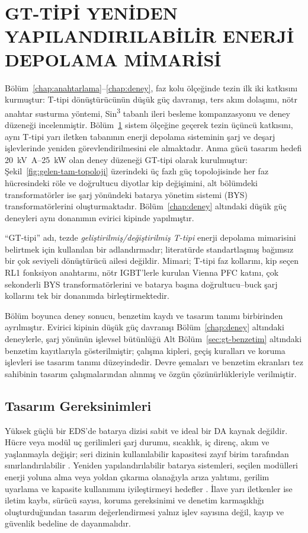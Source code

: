 \chapter{GT-TİPİ YENİDEN YAPILANDIRILABİLİR ENERJİ DEPOLAMA MİMARİSİ}
\label{chap:gttipi}

Bölüm~\ref{chap:anahtarlama}--\ref{chap:deney}, faz kolu ölçeğinde tezin ilk iki katkısını kurmuştur: T-tipi dönüştürücünün düşük güç davranışı, ters akım dolaşımı, nötr anahtar susturma yöntemi, Sin\textsuperscript{3} tabanlı ileri besleme kompanzasyonu ve deney düzeneği incelenmiştir. Bölüm~\ref{chap:gttipi} sistem ölçeğine geçerek tezin üçüncü katkısını, aynı T-tipi yarı iletken tabanının enerji depolama sisteminin şarj ve deşarj işlevlerinde yeniden görevlendirilmesini ele almaktadır. Anma gücü tasarım hedefi \SI{20}{\kilo\volt\ampere}--\SI{25}{\kilo\watt} olan deney düzeneği GT-tipi olarak kurulmuştur: Şekil~\ref{fig:gelen-tam-topoloji} üzerindeki üç fazlı güç topolojisinde her faz hücresindeki röle ve doğrultucu diyotlar kip değişimini, alt bölümdeki transformatörler ise şarj yönündeki batarya yönetim sistemi (BYS) transformatörlerini oluşturmaktadır. Bölüm~\ref{chap:deney} altındaki düşük güç deneyleri aynı donanımın evirici kipinde yapılmıştır.

``GT-tipi'' adı, tezde \emph{geliştirilmiş/değiştirilmiş T-tipi} enerji depolama mimarisini belirtmek için kullanılan bir adlandırmadır; literatürde standartlaşmış bağımsız bir çok seviyeli dönüştürücü ailesi değildir. Mimari; T-tipi faz kollarını, kip seçen RL1 fonksiyon anahtarını, nötr IGBT'lerle kurulan Vienna PFC katını, çok sekonderli BYS transformatörlerini ve batarya başına doğrultucu--buck şarj kollarını tek bir donanımda birleştirmektedir.

Bölüm boyunca deney sonucu, benzetim kaydı ve tasarım tanımı birbirinden ayrılmıştır. Evirici kipinin düşük güç davranışı Bölüm~\ref{chap:deney} altındaki deneylerle, şarj yönünün işlevsel bütünlüğü Alt Bölüm~\ref{sec:gt-benzetim} altındaki benzetim kayıtlarıyla gösterilmiştir; çalışma kipleri, geçiş kuralları ve koruma işlevleri ise tasarım tanımı düzeyindedir. Devre şemaları ve benzetim ekranları tez sahibinin tasarım çalışmalarından alınmış ve özgün çözünürlükleriyle verilmiştir.

\section{Tasarım Gereksinimleri}
\label{sec:gt-gereksinimler}

Yüksek güçlü bir EDS'de batarya dizisi sabit ve ideal bir DA kaynak değildir. Hücre veya modül uç gerilimleri şarj durumu, sıcaklık, iç direnç, akım ve yaşlanmayla değişir; seri dizinin kullanılabilir kapasitesi zayıf birim tarafından sınırlandırılabilir \citep{Plett2015,Hannan2017,Farakhor2023}. Yeniden yapılandırılabilir batarya sistemleri, seçilen modülleri enerji yoluna alma veya yoldan çıkarma olanağıyla arıza yalıtımı, gerilim uyarlama ve kapasite kullanımını iyileştirmeyi hedefler \citep{Momayyezan2016,Farakhor2023,Huang2024}. İlave yarı iletkenler ise iletim kaybı, sürücü sayısı, koruma gereksinimi ve denetim karmaşıklığı oluşturduğundan tasarım değerlendirmesi yalnız işlev sayısına değil, kayıp ve güvenlik bedeline de dayanmalıdır.

